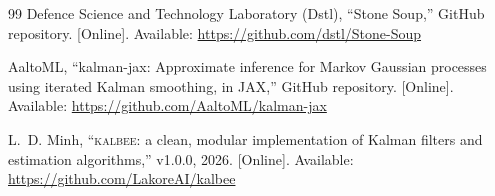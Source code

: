 \documentclass[10pt,conference]{IEEEtran}
\newcommand{\toolkit}{\textsc{kalbee}}
\begin{document}
\begin{thebibliography}{99}
 Defence Science and Technology Laboratory (Dstl), ``Stone
Soup,'' GitHub repository. [Online]. Available:
\url{https://github.com/dstl/Stone-Soup}

 AaltoML, ``kalman-jax: Approximate inference for Markov
Gaussian processes using iterated Kalman smoothing, in JAX,'' GitHub
repository. [Online]. Available: \url{https://github.com/AaltoML/kalman-jax}

 L.~D. Minh, ``\toolkit{}: a clean, modular
implementation of Kalman filters and estimation algorithms,'' v1.0.0, 2026.
[Online]. Available: \url{https://github.com/LakoreAI/kalbee}

\end{thebibliography}
\endgroup
\end{document}
